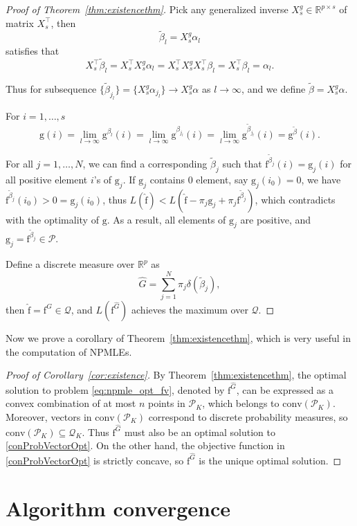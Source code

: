 \documentclass[11pt]{article}
\numberwithin{equation}{section}
\newcommand{\RS}{\mathbb{R}}
\newcommand{\PS}{\mathcal{P}}
\newcommand{\QS}{\mathcal{Q}}
\newcommand{\T}{ \top }
\newcommand{\fv}{\mathrm{f}}
\newcommand{\gv}{\mathrm{g}}
\begin{document}
\begin{appendices}
\begin{proof}[Proof of Theorem~\ref{thm:existencethm}]
Pick any generalized inverse  $X_s^g\in \RS^{p\times s}$   of matrix $X^\T_s$, then
\[
\tilde{\beta}_l = X_s^g\alpha_l
\]
satisfies that
\[
X_s^\T \tilde{\beta}_l = X_s^\T X_s^g\alpha_l = X_s^\T X_s^g X_s^\T\beta_l = X_s^\T\beta_l = \alpha_l.
\]

Thus for subsequence $\{\tilde{\beta}_{j_l}\} =\{ X_s^g \alpha_{j_l}\} \rightarrow X^g_s \alpha$ as $l \rightarrow \infty$, and we define $\tilde{\beta} = X^g_s \alpha$.

For $i = 1,\dots,s$
\[
\gv(i) = \lim_{l\rightarrow \infty} \gv^{\beta_l}(i) =
\lim_{l\rightarrow \infty} \gv^{\beta_{j_l}}(i)=\lim_{l\rightarrow \infty} \gv^{\tilde{\beta}_{j_l}}(i) = \gv^{\tilde{\beta}}(i).
\]

For all $j =1,\dots, N$, we can find a corresponding $\tilde{\beta}_j$ such that $\fv^{\tilde{\beta}_j}(i) = \gv_j(i)$ for all positive element $i$'s of $\gv_j$. If $\gv_j$ contains $0$ element, say $\gv_j(i_0) = 0$, we have $\fv^{\tilde{\beta}_j}(i_0)>0=\gv_j(i_0)$, thus $L(\hat{\fv})<L(\hat{\fv}-\pi_j \gv_j+\pi_j \fv^{\tilde{\beta}_j})$, which contradicts with the optimality of $\gv$. As a result, all elements of $\gv_j$ are positive, and $\gv_j = \fv^{\tilde{\beta}_j} \in \PS$.

Define a discrete measure over $\RS^p$ as
\[
\hat{G}= \sum_{j=1}^{N} \pi_j  \delta(\tilde{\beta}_j),
\]
then $\hat{\fv} = \fv^{\hat{G}} \in \QS$, and $L(\fv^{\hat{G}})$ achieves the maximum over $\QS$.
\end{proof}

Now we prove a corollary of Theorem~\ref{thm:existencethm}, which is very useful in the computation of NPMLEs.

\begin{proof}[Proof of Corollary~\ref{cor:existence}]
By Theorem~\ref{thm:existencethm}, the optimal solution to problem \eqref{eq:npmle_opt_fv}, denoted by $\fv^{\hat{G}}$, can be expressed as a convex combination of at most $n$ points in $\PS_K$, which belongs to $\mathrm{conv}(\PS_K)$. Moreover, vectors in $\mathrm{conv}(\PS_K)$ correspond to discrete probability measures, so $\mathrm{conv}(\PS_K) \subseteq \QS_K$. Thus $\fv^{\hat{G}}$ must also be an optimal solution to \eqref{conProbVectorOpt}. On the other hand, the objective function in \eqref{conProbVectorOpt} is strictly concave, so $\fv^{\hat{G}}$ is the unique optimal solution.
\end{proof}

\section{Algorithm convergence}
\label{app:cgm}


\end{appendices}
\end{document}
